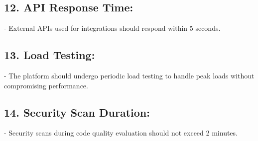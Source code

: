 \subsection*{12. API Response Time:}
    - External APIs used for integrations should respond within 5 seconds.

\subsection*{13. Load Testing:}
    - The platform should undergo periodic load testing to handle peak loads without compromising performance.

\subsection*{14. Security Scan Duration:}
    - Security scans during code quality evaluation should not exceed 2 minutes.





